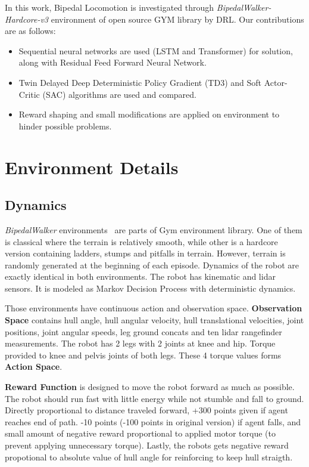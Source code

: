 \documentclass[a4paper, 12pt]{article} %
\begin{document}
In this work, Bipedal Locomotion is investigated through \textit{BipedalWalker-Hardcore-v3} \cite{noauthor_bipedalwalkerhardcore-v2_2021} environment of open source GYM library \cite{brockman_openai_2016} by DRL. 
Our contributions are as follows:
\begin{itemize}
	\item Sequential neural networks are used (LSTM and Transformer) for solution, along with Residual Feed Forward Neural Network.
	\item Twin Delayed Deep Deterministic Policy Gradient (TD3) and Soft Actor-Critic (SAC) algorithms are used and compared.
	\item Reward shaping and small modifications are applied on environment to hinder possible problems.
\end{itemize}

\section{Environment Details}

\subsection{Dynamics}

\textit{BipedalWalker} environments~\cite{noauthor_bipedalwalker-v2_2021, noauthor_bipedalwalkerhardcore-v2_2021} are parts of Gym environment library. 
One of them is classical where the terrain is relatively smooth, while other is a hardcore version containing ladders, stumps and pitfalls in terrain. 
However, terrain is randomly generated at the beginning of each episode.
Dynamics of the robot are exactly identical in both environments. 
The robot has kinematic and lidar sensors. 
It is modeled as Markov Decision Process with deterministic dynamics.

Those environments have continuous action and observation space. 
\textbf{Observation Space} contains hull angle, hull angular velocity, hull translational velocities, joint positions, joint angular speeds, leg ground concats and ten lidar rangefinder measurements.
The robot has 2 legs with 2 joints at knee and hip. Torque provided to knee and pelvis joints of both legs. These 4 torque values forms  \textbf{Action Space}.

\textbf{Reward Function} is designed to move the robot forward as much as possible.
The robot should run fast with little energy while not stumble and fall to ground. 
Directly proportional to distance traveled forward, +300 points given if agent reaches end of path. 
-10 points (-100 points in original version) if agent falls, 
and small amount of negative reward proportional to applied motor torque (to prevent applying unnecessary torque). 
Lastly, the robots gets negative reward propotional to absolute value of hull angle for reinforcing to keep hull straigth. 
\end{document}
